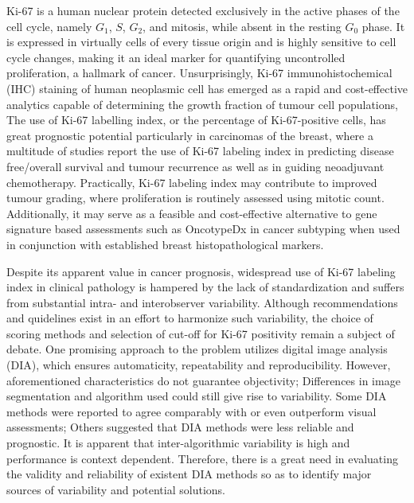 \documentclass[final,3p,times]{elsarticle}
\begin{document}
Ki-67 is a human nuclear protein detected exclusively in the active phases of the cell cycle, namely $G_1$, $S$, $G_2$, and mitosis, while absent in the resting $G_0$ phase.\cite{Gerdes1984} It is expressed in virtually cells of every tissue origin and is highly sensitive to cell cycle changes, making it an ideal marker for quantifying uncontrolled proliferation, a hallmark of cancer. Unsurprisingly, Ki-67 immunohistochemical (IHC) staining of human neoplasmic cell has emerged as a rapid and cost-effective analytics capable of determining the growth fraction of tumour cell populations,  \cite{Scholzen2000} The use of Ki-67 labelling index, or the percentage of Ki-67-positive cells, has great prognostic potential particularly in carcinomas of the breast, where a multitude of studies report the use of Ki-67 labeling index in predicting disease free/overall survival and tumour recurrence \cite{Stuart-Harris2005, DeAzambuja2007, Petrelli2015} as well as in guiding neoadjuvant chemotherapy. \cite{Jones2009, Nishimura2010, Fasching2011} Practically, Ki-67 labeling index may contribute to improved tumour grading, where proliferation is routinely assessed using mitotic count. \cite{VanDiest2004} Additionally, it may serve as a feasible and cost-effective alternative to gene signature based assessments such as OncotypeDx in cancer subtyping when used in conjunction with established breast histopathological markers. \cite{Cuzick2011}

Despite its apparent value in cancer prognosis, widespread use of Ki-67 labeling index in clinical pathology is hampered by the lack of standardization and suffers from substantial intra- and interobserver variability. \cite{Dowsett2011a, Polley2013a} Although recommendations and quidelines exist in an effort to harmonize such variability, \cite{Polley2015} the choice of scoring methods and selection of cut-off for Ki-67 positivity remain a subject of debate. One promising approach to the problem utilizes digital image analysis (DIA), which ensures automaticity, repeatability and reproducibility. However, aforementioned characteristics do not guarantee objectivity; Differences in image segmentation and algorithm used could still give rise to variability. \cite{Tadrous2010} Some DIA methods were reported to agree comparably with \cite{Mohammed2012} or even outperform visual assessments; \cite{Laurinavicius2014, Stalhammar2016} Others suggested that DIA methods were less reliable and prognostic. \cite{Chabot-Richards2011} It is apparent that inter-algorithmic variability is high and performance is context dependent. Therefore, there is a great need in evaluating the validity and reliability of existent DIA methods so as to identify major sources of variability and potential solutions.
\end{document}
